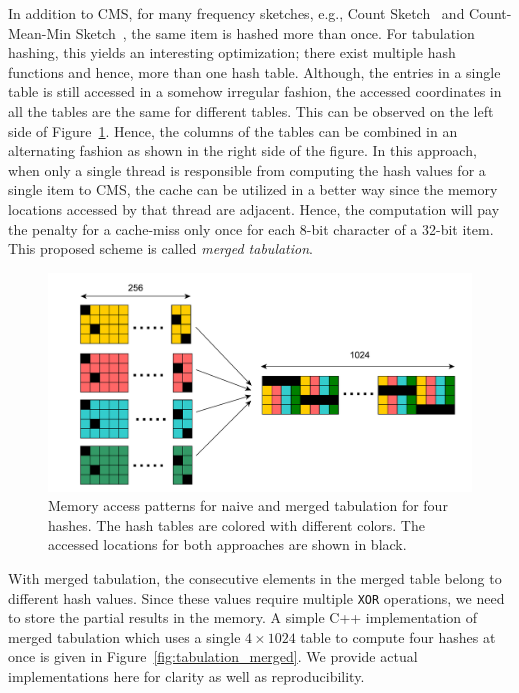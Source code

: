 \documentclass[10pt, review=true,sigconf]{acmart}
\begin{document}
In addition to CMS, for many frequency sketches, e.g., Count Sketch~\cite{charikar2002} and Count-Mean-Min Sketch~\cite{Goyal2012}, the same item is hashed more than once. For tabulation hashing, this yields an interesting optimization; there exist multiple hash functions and hence, more than one hash table. Although, the entries in a single table is still accessed in a somehow irregular fashion, the accessed coordinates in all the tables are the same for different tables. This can be observed on the left side of Figure~\ref{fig:merged_tabular_access}. Hence, the columns of the tables can be combined in an alternating fashion as shown in the right side of the figure. In this approach, when only a single thread is responsible from computing the hash values for a single item to CMS, the cache can be utilized in a better way since the memory locations accessed by that thread are adjacent. Hence, the computation will pay the penalty for a cache-miss only once for each 8-bit character of a 32-bit item. This proposed scheme is called {\em merged tabulation}.

 \begin{figure}[htbp]
\begin{center}
\includegraphics[width=0.96\linewidth]{merged_tabular_access.pdf}
\caption{Memory access patterns for naive and merged tabulation for four hashes. The hash tables are colored with different colors. The accessed locations for both approaches are shown in black.}
\label{fig:merged_tabular_access}
\end{center}
\end{figure}

With merged tabulation, the consecutive elements in the merged table belong to different hash values. Since these values require multiple {\tt XOR} operations, we need to store the partial results in the memory. A simple C++ implementation of merged tabulation which uses a single $4 \times 1024$ table to compute four hashes at once is given in Figure~\ref{fig:tabulation_merged}. We provide actual implementations here for clarity as well as reproducibility.
\end{document}
